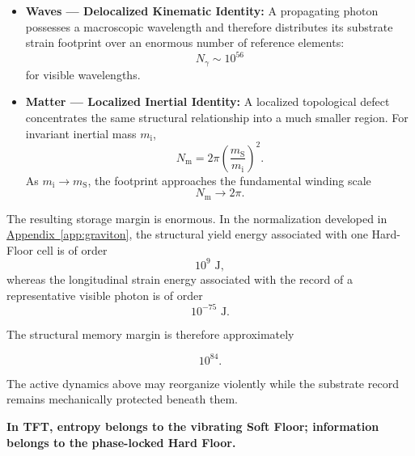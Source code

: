 \begin{itemize}

    \item \textbf{Waves --- Delocalized Kinematic Identity:}
    A propagating photon possesses a macroscopic wavelength and therefore distributes its substrate strain footprint over an enormous number of reference elements:
    \begin{equation}
        N_{\gamma}\sim10^{56}
    \end{equation}
    for visible wavelengths.

    \item \textbf{Matter --- Localized Inertial Identity:}
    A localized topological defect concentrates the same structural relationship into a much smaller region. For invariant inertial mass $m_{\mathrm i}$,
    \begin{equation}
        N_{\mathrm m}
        =
        2\pi
        \left(
            \frac{m_{\mathrm S}}{m_{\mathrm i}}
        \right)^2.
    \end{equation}
    As $m_{\mathrm i}\rightarrow m_{\mathrm S}$, the footprint approaches the fundamental winding scale
    \begin{equation}
        N_{\mathrm m}\rightarrow2\pi.
    \end{equation}

\end{itemize}

The resulting storage margin is enormous. In the normalization developed in \hyperref[app:graviton]{Appendix~\ref*{app:graviton}}, the structural yield energy associated with one Hard-Floor cell is of order
\begin{equation}
    10^9\text{ J},
\end{equation}
whereas the longitudinal strain energy associated with the record of a representative visible photon is of order
\begin{equation}
    10^{-75}\text{ J}.
\end{equation}

The structural memory margin is therefore approximately

\begin{equation}
    10^{84}.
\end{equation}

The active dynamics above may reorganize violently while the substrate record remains mechanically protected beneath them.

\textbf{In TFT, entropy belongs to the vibrating Soft Floor; information belongs to the phase-locked Hard Floor.}

